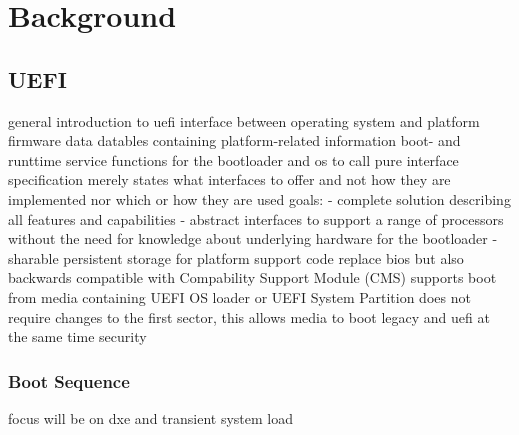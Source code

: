 %
\chapter{Background}


\section{UEFI}

general introduction to uefi
interface between operating system and platform firmware
data datables containing platform-related information
boot- and runttime service functions for the bootloader and os to call
pure interface specification
merely states what interfaces to offer and not how they are implemented nor which or how they are used
goals:
- complete solution describing all features and capabilities
- abstract interfaces to support a range of processors without the need for knowledge about underlying hardware for the bootloader
- sharable persistent storage for platform support code
replace bios but also backwards compatible with Compability Support Module (CMS)
supports boot from media containing UEFI OS loader or UEFI System Partition
does not require changes to the first sector, this allows media to boot legacy and uefi at the same time
security

\subsection{Boot Sequence}
focus will be on dxe and transient system load

